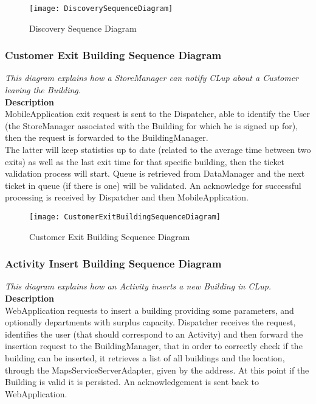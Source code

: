 \begin{figure}[H]
 \centering
 \texttt{[image: DiscoverySequenceDiagram]}
 \caption{ Discovery Sequence Diagram }
 \end{figure}

\newpage
\subsubsection{Customer Exit Building Sequence Diagram}
\textit{This diagram explains how a StoreManager can notify CLup about a Customer leaving the Building.\\}
\textbf{Description\\}
MobileApplication exit request is sent to the Dispatcher, able to identify the User (the StoreManager associated with the Building for which he is signed up for), then the request is forwarded to the BuildingManager.\\
The latter will keep statistics up to date (related to the average time between two exits) as well as the last exit time for that specific building, then the ticket validation process will start. Queue is retrieved from DataManager and the next ticket in queue (if there is one) will be validated. An acknowledge for successful processing is received by Dispatcher and then MobileApplication.\\

\begin{figure}[H]
 \centering
 \texttt{[image: CustomerExitBuildingSequenceDiagram]}
 \caption{ Customer Exit Building Sequence Diagram }
 \end{figure}

\newpage
\subsubsection{Activity Insert Building Sequence Diagram}
\textit{This diagram explains how an Activity inserts a new Building in CLup.\\}
\textbf{Description\\}
WebApplication requests to insert a building providing some parameters, and optionally departments with surplus capacity. Dispatcher receives the request, identifies the user (that should correspond to an Activity) and then forward the insertion request to the BuildingManager, that in order to correctly check if the building can be inserted, it retrieves a list of all buildings and the location, through the MapsServiceServerAdapter, given by the address. At this point if the Building is valid it is persisted. An acknowledgement is sent back to WebApplication.\\

